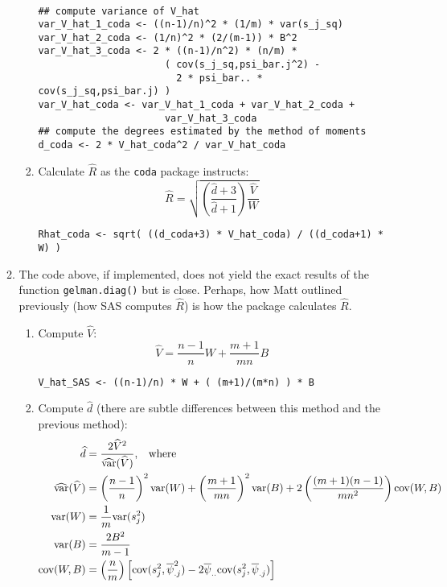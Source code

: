 \documentclass[11pt]{article}\usepackage[]{graphicx}\usepackage[]{color}
\begin{document}
\begin{enumerate}
\begin{enumerate}
\begin{enumerate}
{\begin{equation*}
\begin{split}
\end{split}
\end{equation*}
}    \vspace{-0.5cm}
{\color{red}
\begin{verbatim}
## compute variance of V_hat
var_V_hat_1_coda <- ((n-1)/n)^2 * (1/m) * var(s_j_sq)
var_V_hat_2_coda <- (1/n)^2 * (2/(m-1)) * B^2
var_V_hat_3_coda <- 2 * ((n-1)/n^2) * (n/m) * 
                      ( cov(s_j_sq,psi_bar.j^2) - 
                        2 * psi_bar.. * cov(s_j_sq,psi_bar.j) )
var_V_hat_coda <- var_V_hat_1_coda + var_V_hat_2_coda + 
                      var_V_hat_3_coda
## compute the degrees estimated by the method of moments
d_coda <- 2 * V_hat_coda^2 / var_V_hat_coda
\end{verbatim}
}
    \item Calculate $\widehat{R}$ as the \verb|coda| package instructs:
{\color{blue}
$$\widehat{R} = \sqrt{\left(\frac{\widehat{d}+3}{\widehat{d}+1}\right)\frac{\widehat{V}}{W}}$$
}  \vspace{-0.5cm}
{\color{red}
\begin{verbatim}
Rhat_coda <- sqrt( ((d_coda+3) * V_hat_coda) / ((d_coda+1) * W) )  
\end{verbatim}
}
    \end{enumerate}
    
  \item The code above, if implemented, does not yield the exact results of the function \verb|gelman.diag()| but is close. Perhaps, how Matt outlined previously (how SAS computes $\widehat{R}$) is how the package calculates $\widehat{R}$.
    \begin{enumerate}
    \item Compute $\widehat{V}$:
{\color{blue}
$$\widehat{V} = \frac{n-1}{n}W + \frac{m+1}{mn}B$$
}    \vspace{-0.5cm}
{\color{red}
\begin{verbatim}
V_hat_SAS <- ((n-1)/n) * W + ( (m+1)/(m*n) ) * B
\end{verbatim}
} 
    \item Compute $\widehat{d}$ (there are subtle differences between this method and the previous method):
{\color{blue}
\begin{equation*}
\begin{split}
\widehat{d} & = \frac{2\widehat{V}^2}{\widehat{\text{var}}(\widehat{V})}, \hspace{0.3cm} \text{where}\\
\widehat{\text{var}}(\widehat{V}) & = \left(\frac{n-1}{n}\right)^2\text{var}(W) + \left(\frac{m+1}{mn}\right)^2\text{var}(B) + 2\left(\frac{(m+1)(n-1)}{mn^2}\right)\text{cov}(W,B)\\
\text{var}(W) & = \frac{1}{m}\text{var}(s_j^2)\\
\text{var}(B) & = \frac{2B^2}{m-1}\\
\text{cov}(W,B) & = \left(\frac{n}{m}\right)\left[\text{cov}(s_j^2,\overline{\psi}_{.j}^2) - 2\overline{\psi}_{..}\text{cov}(s_j^2,\overline{\psi}_{.j})\right]
\end{split}
\end{equation*}
}        
    

\end{enumerate}
\end{enumerate}
\end{enumerate}
\end{document}
